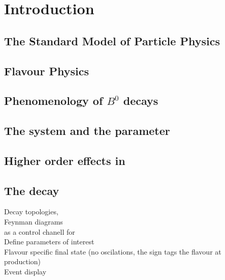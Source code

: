 
\chapter{Introduction}
\label{Introduction}


\section{The Standard Model of Particle Physics}

\section{Flavour Physics}

\section{Phenomenology of $B^0$ decays}

\section{The \Bs system and the \phis parameter}

\section{Higher order effects in \phis}

\section{The \BsJpsiKst decay}
Decay topologies,\\
Feynman diagrams \\
\BsJpsiKst as a control chanell for \phis \\
Define parameters of interest\\
Flavour specific final state (no oscilations, the sign tags the flavour at production) \\

Event display \\
